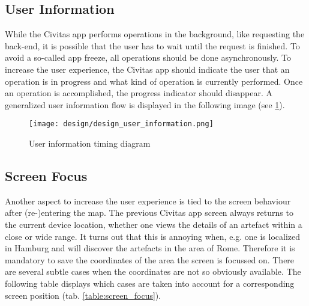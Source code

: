 \subsection{User Information}
While the Civitas app performs operations in the background, like requesting the back-end, it is possible that the user has to wait until the request is finished. To avoid a so-called app freeze, all operations should be done asynchronously. To increase the user experience, the Civitas app should indicate the user that an operation is in progress and what kind of operation is currently performed. Once an operation is accomplished, the progress indicator should disappear. A generalized user information flow is displayed in the following image (see \ref{fig:design_user_information}).

\begin{figure}[H]
    \centering \texttt{[image: design/design\_user\_information.png]}
    \caption{User information timing diagram}    
    \label{fig:design_user_information}
\end{figure}


\subsection{Screen Focus}
Another aspect to increase the user experience is tied to the screen behaviour after (re-)entering the map. The previous Civitas app screen always returns to the current device location, whether one views the details of an artefact within a close or wide range. It turns out that this is annoying when, e.g. one is localized in Hamburg and will discover the artefacts in the area of Rome. Therefore it is mandatory to save the coordinates of the area the screen is focussed on. There are several subtle cases when the coordinates are not so obviously available. The following table displays which cases are taken into account for a corresponding screen position (tab. \ref{table:screen_focus}).

